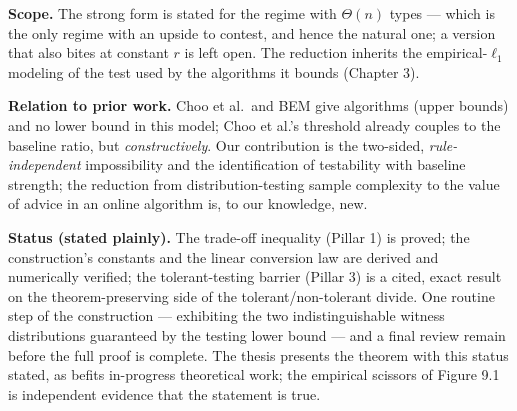 \textbf{Scope.} The strong form is stated for the regime with \(\Theta(n)\) types --- which is the
only regime with an upside to contest, and hence the natural one; a version that also bites
at constant \(r\) is left open. The reduction inherits the empirical-\(\ell_1\) modeling of the
test used by the algorithms it bounds (Chapter 3).

\textbf{Relation to prior work.} Choo et al.~and BEM give algorithms (upper bounds) and no lower
bound in this model; Choo et al.'s threshold already couples to the baseline ratio, but
\emph{constructively}. Our contribution is the two-sided, \emph{rule-independent} impossibility and the
identification of testability with baseline strength; the reduction from
distribution-testing sample complexity to the value of advice in an online algorithm is, to
our knowledge, new.

\textbf{Status (stated plainly).} The trade-off inequality (Pillar 1) is proved; the construction's
constants and the linear conversion law are derived and numerically verified; the
tolerant-testing barrier (Pillar 3) is a cited, exact result on the theorem-preserving side of
the tolerant/non-tolerant divide. One routine step of the construction --- exhibiting the two
indistinguishable witness distributions guaranteed by the testing lower bound --- and a final
review remain before the full proof is complete. The thesis presents the theorem with this
status stated, as befits in-progress theoretical work; the empirical scissors of Figure 9.1
is independent evidence that the statement is true.
